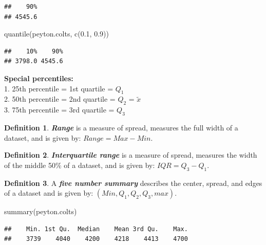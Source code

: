 \documentclass[
  11pt,
]{book}
\newenvironment{Shaded}{\begin{snugshade}}{\end{snugshade}}
\newcommand{\FloatTok}[1]{\textcolor[rgb]{0.00,0.00,0.81}{#1}}
\newcommand{\FunctionTok}[1]{\textcolor[rgb]{0.00,0.00,0.00}{#1}}
\newcommand{\NormalTok}[1]{#1}
\theoremstyle{definition}
\newtheorem{definition}{Definition}[chapter]
\theoremstyle{definition}
\theoremstyle{definition}
\theoremstyle{definition}
\theoremstyle{remark}
\begin{document}
\begin{verbatim}
##    90% 
## 4545.6
\end{verbatim}

\begin{Shaded}
\begin{Highlighting}[]
\FunctionTok{quantile}\NormalTok{(peyton.colts, }\FunctionTok{c}\NormalTok{(}\FloatTok{0.1}\NormalTok{, }\FloatTok{0.9}\NormalTok{))}
\end{Highlighting}
\end{Shaded}

\begin{verbatim}
##    10%    90% 
## 3798.0 4545.6
\end{verbatim}

\textbf{Special percentiles:}\\
1. 25th percentile = 1st quartile = \(Q_1\)\\
2. 50th percentile = 2nd quartile = \(Q_2\) = \(\tilde{x}\)\\
3. 75th percentile = 3rd quartile = \(Q_3\)\\

\begin{definition}
\textbf{\emph{Range}} is a measure of spread, measures the full width of a dataset, and is given by: \(Range = Max - Min\).
\end{definition}

\begin{definition}
\textbf{\emph{Interquartile range}} is a measure of spread, measures the width of the middle 50\% of a dataset, and is given by: \(IQR = Q_3 - Q_1\).
\end{definition}

\begin{definition}
A \textbf{\emph{five number summary}} describes the center, spread, and edges of a dataset and is given by: \((Min,Q_1,Q_2,Q_3,max)\).
\end{definition}

\begin{Shaded}
\begin{Highlighting}[]
\FunctionTok{summary}\NormalTok{(peyton.colts)}
\end{Highlighting}
\end{Shaded}

\begin{verbatim}
##    Min. 1st Qu.  Median    Mean 3rd Qu.    Max. 
##    3739    4040    4200    4218    4413    4700
\end{verbatim}
\end{document}

